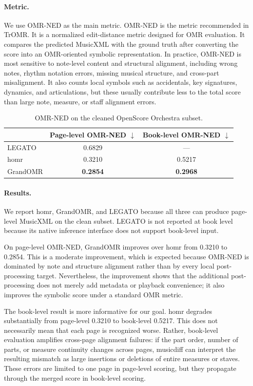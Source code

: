 \documentclass[11pt,a4paper]{article}
\begin{document}
\paragraph{Metric.}
We use OMR-NED as the main metric.
OMR-NED is the metric recommended in TrOMR.
It is a normalized edit-distance metric designed for OMR evaluation.
It compares the predicted MusicXML with the ground truth after converting the score into an OMR-oriented symbolic representation.
In practice, OMR-NED is most sensitive to note-level content and structural alignment, including wrong notes, rhythm notation errors, missing musical structure, and cross-part misalignment.
It also counts local symbols such as accidentals, key signatures, dynamics, and articulations, but these usually contribute less to the total score than large note, measure, or staff alignment errors.

\begin{table}[h]
\centering
\begin{tabular}{@{}lcc@{}}
\toprule
& \textbf{Page-level OMR-NED $\downarrow$} & \textbf{Book-level OMR-NED $\downarrow$} \\
\midrule
LEGATO   & 0.6829 & --- \\
homr     & 0.3210 & 0.5217 \\
GrandOMR & \textbf{0.2854} & \textbf{0.2968} \\
\bottomrule
\end{tabular}
\caption{OMR-NED on the cleaned OpenScore Orchestra subset.}
\label{tab:openscore_omr_ned}
\end{table}

\paragraph{Results.}
We report homr, GrandOMR, and LEGATO because all three can produce page-level MusicXML on the clean subset.
LEGATO is not reported at book level because its native inference interface does not support book-level input.

On page-level OMR-NED, GrandOMR improves over homr from 0.3210 to 0.2854.
This is a moderate improvement, which is expected because OMR-NED is dominated by note and structure alignment rather than by every local post-processing target.
Nevertheless, the improvement shows that the additional post-processing does not merely add metadata or playback convenience; it also improves the symbolic score under a standard OMR metric.

The book-level result is more informative for our goal.
homr degrades substantially from page-level 0.3210 to book-level 0.5217.
This does not necessarily mean that each page is recognized worse.
Rather, book-level evaluation amplifies cross-page alignment failures: if the part order, number of parts, or measure continuity changes across pages, musicdiff can interpret the resulting mismatch as large insertions or deletions of entire measures or staves.
These errors are limited to one page in page-level scoring, but they propagate through the merged score in book-level scoring.
\end{document}
